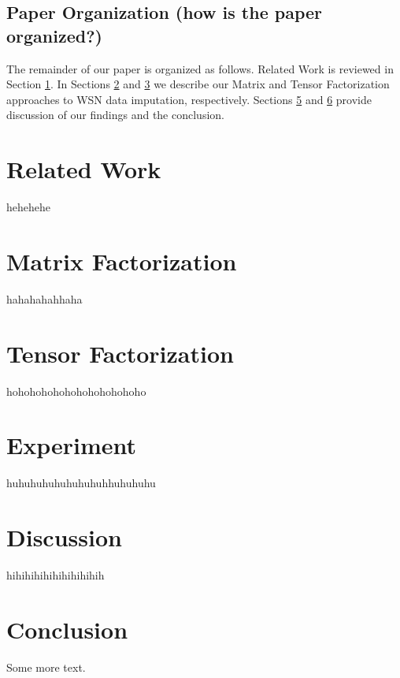 \documentclass[10pt]{sensys11}
\begin{document}
\subsection{Paper Organization (how is the paper organized?)}
The remainder of our paper is organized as follows.
Related Work is reviewed in Section \ref{sec:rw}.
In Sections \ref{sec:mf} and \ref{sec:tf} we describe our Matrix and Tensor Factorization approaches to WSN data imputation, respectively.
Sections \ref{sec:disc} and \ref{sec:conc} provide discussion of our findings and the conclusion.

\section{Related Work} \label{sec:rw}
hehehehe
\section{Matrix Factorization}  \label{sec:mf}

hahahahahhaha

\section{Tensor Factorization}  \label{sec:tf}
hohohohohohohohohohohoho
\section{Experiment}  \label{sec:exp}
huhuhuhuhuhuhuhuhhuhuhuhu
\section{Discussion}  \label{sec:disc}
hihihihihihihihihihih
\section{Conclusion}  \label{sec:conc}

Some more text.


{\footnotesize


}
\end{document}
